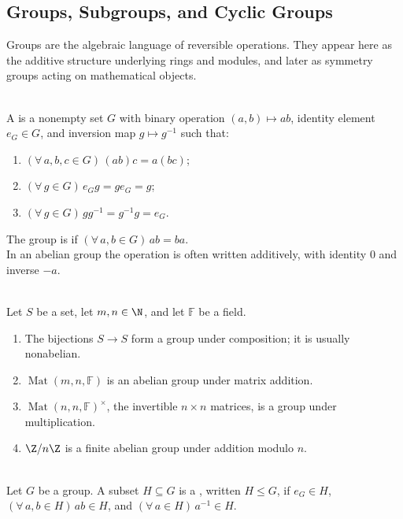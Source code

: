 \subsection{Groups, Subgroups, and Cyclic Groups}

Groups are the algebraic language of reversible operations. They appear here as the additive structure underlying rings and modules, and later as symmetry groups acting on mathematical objects.

\begin{definition} \label{def:group-and-abelian-group} \\
A  is a nonempty set $G$ with binary operation $(a,b)\mapsto ab$, identity element $e_G\in G$, and inversion map $g\mapsto g^{-1}$ such that:
\begin{enumerate}[label=(\roman*)]
\setlength{\itemsep}{0pt}
\item $(\forall\,a,b,c\in G)\,(ab)c=a(bc)$;
\item $(\forall\,g\in G)\,e_Gg=ge_G=g$;
\item $(\forall\,g\in G)\,gg^{-1}=g^{-1}g=e_G$.
\end{enumerate}
The group is  if $(\forall\,a,b\in G)\,ab=ba$.\\
In an abelian group the operation is often written additively, with identity $0$ and inverse $-a$.
\end{definition}

\begin{example} \label{ex:basic-groups-from-linear-algebra} \\
Let $S$ be a set, let $m,n\in\N$, and let $\mathbb{F}$ be a field.
\begin{enumerate}[label=(\roman*)]
\setlength{\itemsep}{0pt}
\item The bijections $S\to S$ form a group under composition; it is usually nonabelian.
\item $\operatorname{Mat}(m,n,\mathbb{F})$ is an abelian group under matrix addition.
\item $\operatorname{Mat}(n,n,\mathbb{F})^{\times}$, the invertible $n\times n$ matrices, is a group under multiplication.
\item $\Z/n\Z$ is a finite abelian group under addition modulo $n$.
\end{enumerate}
\end{example}

\begin{definition} \label{def:subgroup} \\
Let $G$ be a group. A subset $H\subseteq G$ is a , written $H\leq G$, if $e_G\in H$, $(\forall\,a,b\in H)\,ab\in H$, and $(\forall\,a\in H)\,a^{-1}\in H$.
\end{definition}

